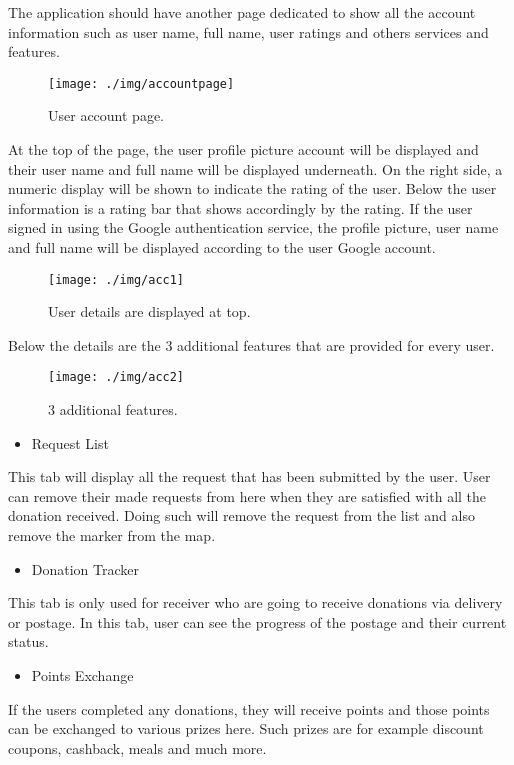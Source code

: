 \documentclass[conference]{IEEEtran}
\begin{document}
\par The application should have another page dedicated to show all the account information such as user name, full name, user ratings and others services and features. 

\begin{figure}[h!]
\texttt{[image: ./img/accountpage]}
\centering
\caption{User account page.}
\end{figure}

At the top of the page, the user profile picture account will be displayed and their user name and full name will be displayed underneath. On the right side, a numeric display will be shown to indicate the rating of the user. Below the user information is a rating bar that shows accordingly by the rating. If the user signed in using the Google authentication service, the profile picture, user name and full name will be displayed according to the user Google account.\\

\begin{figure}[h!]
\texttt{[image: ./img/acc1]}
\centering
\caption{User details are displayed at top.}
\end{figure}

Below the details are the 3 additional features that are provided for every user. \\
\begin{figure}[h!]
\texttt{[image: ./img/acc2]}
\centering
\caption{3 additional features.}
\end{figure}
\begin{itemize}
\item Request List
\end{itemize}
This tab will display all the request that has been submitted by the user. User can remove their made requests from here when they are satisfied with all the donation received. Doing such will remove the request from the list and also remove the marker from the map.
\begin{itemize}
\item Donation Tracker
\end{itemize}
This tab is only used for receiver who are going to receive donations via delivery or postage. In this tab, user can see the progress of the postage and their current status.
\begin{itemize}
\item Points Exchange
\end{itemize}
If the users completed any donations, they will receive points and those points can be exchanged to various prizes here. Such prizes are for example discount coupons, cashback, meals and much more.\\
\end{document}
